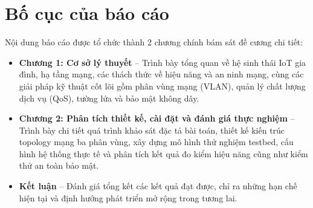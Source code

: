 \section*{Bố cục của báo cáo}
Nội dung báo cáo được tổ chức thành 2 chương chính bám sát đề cương chi tiết:
\begin{itemize}
    \item \textbf{Chương 1: Cơ sở lý thuyết} -- Trình bày tổng quan về hệ sinh thái IoT gia đình, hạ tầng mạng, các thách thức về hiệu năng và an ninh mạng, cùng các giải pháp kỹ thuật cốt lõi gồm phân vùng mạng (VLAN), quản lý chất lượng dịch vụ (QoS), tường lửa và bảo mật không dây.
    \item \textbf{Chương 2: Phân tích thiết kế, cài đặt và đánh giá thực nghiệm} -- Trình bày chi tiết quá trình khảo sát đặc tả bài toán, thiết kế kiến trúc topology mạng ba phân vùng, xây dựng mô hình thử nghiệm testbed, cấu hình hệ thống thực tế và phân tích kết quả đo kiểm hiệu năng cũng như kiểm thử an toàn bảo mật.
    \item \textbf{Kết luận} -- Đánh giá tổng kết các kết quả đạt được, chỉ ra những hạn chế hiện tại và định hướng phát triển mở rộng trong tương lai.
\end{itemize}

